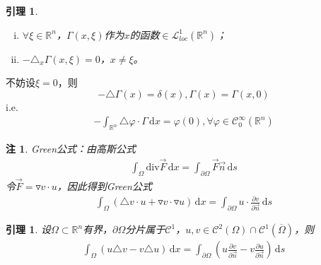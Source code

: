 \documentclass[11pt, a4paper]{article}
\theoremstyle{theorem}
\newtheorem{lemma}[thm]{引理}
\newtheorem*{note}{注}
\newcommand{\intd}[1]{\,\mathrm{d}{#1}}
\begin{document}
 \begin{lemma}
 \label{lemma5-1-1}
 \begin{enumerate}[(i)]
   \item $\forall \xi \in \mathbb{R}^n$，$\Gamma(x,\xi)$作为$x$的函数$\in \mathcal{L}_{loc}^1(\mathbb{R}^n)$；
   \item $- \triangle_x \Gamma(x,\xi) = 0$，$x \neq \xi$。
 \end{enumerate}
 \end{lemma}

 不妨设$\xi = 0$，则
 $$
 - \triangle \Gamma(x) = \delta(x), \Gamma(x) = \Gamma(x,0)
 $$
 i.e.
 \begin{align}
     \label{equa5-1-1}
     - \int_{\mathbb{R}^n} \triangle \varphi \cdot \Gamma \intd x = \varphi(0), \forall \varphi \in \mathcal{C}_0^\infty(\mathbb{R}^n)
 \end{align}

 \begin{note}
    Green公式：由高斯公式
    \begin{align}
        \int_\Omega \mathrm{div} \vec{F} \intd x = \int_{\partial \Omega} \vec{F} \vec{n} \intd s
    \end{align}
    令$\vec{F} = \triangledown v \cdot u$，因此得到Green公式
    \begin{align}
        \int_\Omega \left(\triangle v \cdot u + \triangledown v \cdot \triangledown u \right) \intd x = \int_{\partial \Omega} u \cdot \frac{\partial v}{\partial \vec{n}} \intd s
    \end{align}
 \end{note}

 \begin{lemma}
  \label{lemma5-1-2}
    设$\Omega \subset \mathbb{R}^n$有界，$\partial \Omega$分片属于$\mathcal{C}^1$，$u,v \in \mathcal{C}^2(\Omega) \cap \mathcal{C}^1(\overline{\Omega})$，则
    \begin{align}
        \int_\Omega (u \triangle v - v \triangle u) \intd x = \int_{\partial \Omega} \left(u \frac{\partial v}{\partial \vec{n}} - v \frac{\partial u}{\partial \vec{n}}\right) \intd s
    \end{align}
 \end{lemma}
\end{document}
